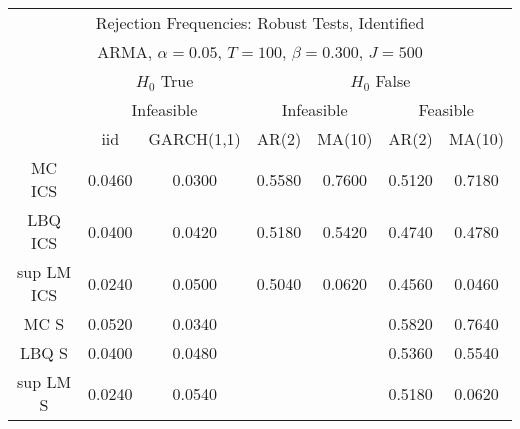  \begin{table}[H] 
 \tiny 
 \centering 
\begin{tabular}{|c|c|c||c|c|c|c|} 
\multicolumn{7}{c}{ Rejection Frequencies: Robust Tests, Identified } \\ 
\multicolumn{7}{c}{ ARMA, $\alpha = 0.05$, $T=100$, $\beta = 0.300$, $J=500$ } \\ 
  \multicolumn{1}{c}{ } & \multicolumn{2}{c}{ $H_{0}$ True} & \multicolumn{4}{c}{ $H_{0}$ False} \\ 
  \multicolumn{1}{c}{ } & \multicolumn{2}{c}{ Infeasible } & \multicolumn{2}{c}{ Infeasible } & \multicolumn{2}{c}{ Feasible} \\ 
 \hline 
 & iid & GARCH(1,1) & AR(2) & MA(10) & AR(2) & MA(10)  \\ 
 \hline 
 MC ICS &  0.0460 &  0.0300 &  0.5580 &  0.7600 &  0.5120 &  0.7180 \\ 
 LBQ ICS &  0.0400 &  0.0420 &  0.5180 &  0.5420 &  0.4740 &  0.4780 \\ 
 sup LM ICS &  0.0240 &  0.0500 &  0.5040 &  0.0620 & 0.4560 &  0.0460 \\ 
 \hline 
 MC S &  0.0520 &  0.0340 & & & 0.5820 &  0.7640  \\ %
 LBQ S &  0.0400 &  0.0480 & & & 0.5360 &  0.5540  \\ %
 sup LM S &  0.0240 &  0.0540 & & & 0.5180 &  0.0620  \\ %

\end{tabular}
\end{table}
